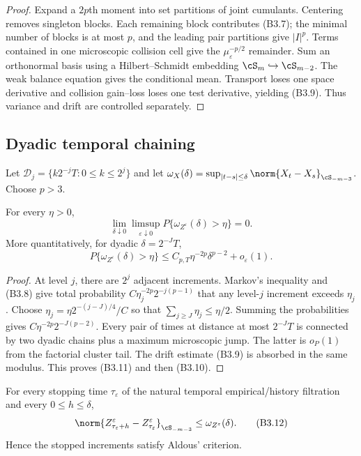 \begin{proof}
Expand a $2p$th moment into set partitions of joint cumulants.  Centering
removes singleton blocks.  Each remaining block contributes (B3.7); the
minimal number of blocks is at most $p$, and the leading pair partitions give
$|I|^p$.  Terms contained in one microscopic collision cell give the
$\mu_\varepsilon^{-p/2}$ remainder.  Sum an orthonormal basis using a
Hilbert--Schmidt embedding $\cS_m\hookrightarrow\cS_{m-2}$.
The weak balance equation gives the conditional mean.  Transport loses one
space derivative and collision gain--loss loses one test derivative, yielding
(B3.9).  Thus variance and drift are controlled separately.
\end{proof}

\subsection{Dyadic temporal chaining}

Let $\mathcal D_j=\{k2^{-j}T:0\le k\le2^j\}$ and let
$\omega_X(\delta)=\sup_{|t-s|\le\delta}\norm{X_t-X_s}_{\cS_{-m-3}}$.
Choose $p>3$.

\begin{lemma}
\label{lem:r31-b3-modulus}
For every $\eta>0$,
\[
 \lim_{\delta\downarrow0}\limsup_{\varepsilon\downarrow0}
 P\{\omega_{Z^\varepsilon}(\delta)>\eta\}=0.              \tag{B3.10}
\]
More quantitatively, for dyadic $\delta=2^{-J}T$,
\[
 P\{\omega_{Z^\varepsilon}(\delta)>\eta\}
 \le C_{p,T}\eta^{-2p}\delta^{p-2}+o_\varepsilon(1).     \tag{B3.11}
\]
\end{lemma}

\begin{proof}
At level $j$, there are $2^j$ adjacent increments.  Markov's inequality and
(B3.8) give total probability
$C\eta_j^{-2p}2^{-j(p-1)}$ that any level-$j$ increment exceeds $\eta_j$.
Choose $\eta_j=\eta 2^{-(j-J)/4}/C$ so that
$\sum_{j\ge J}\eta_j\le\eta/2$.  Summing the probabilities gives
$C\eta^{-2p}2^{-J(p-2)}$.  Every pair of times at distance at most
$2^{-J}T$ is connected by two dyadic chains plus a maximum microscopic jump.
The latter is $o_P(1)$ from the factorial cluster tail.  The drift estimate
(B3.9) is absorbed in the same modulus.  This proves (B3.11) and then (B3.10).
\end{proof}

\begin{corollary}
\label{cor:r31-b3-aldous}
For every stopping time $\tau_\varepsilon$ of the natural temporal
empirical/history filtration and every $0\le h\le\delta$,
\[
 \norm{Z^\varepsilon_{\tau_\varepsilon+h}
      -Z^\varepsilon_{\tau_\varepsilon}}_{\cS_{-m-3}}
 \le\omega_{Z^\varepsilon}(\delta).                       \tag{B3.12}
\]
Hence the stopped increments satisfy Aldous' criterion.
\end{corollary}

